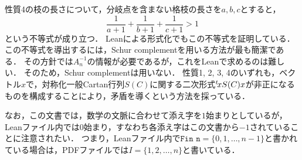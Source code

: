 性質4の枝の長さについて，分岐点を含まない格枝の長さを$a, b, c$とすると，
\begin{equation}
  \frac{1}{a + 1} + \frac{1}{b + 1} + \frac{1}{c + 1} > 1
\end{equation}
という不等式が成り立つ．
Leanによる形式化でもこの不等式を証明している．
この不等式を導出するには，Schur complementを用いる方法が最も簡潔である．
その方針では$A_n^{-1}$の情報が必要であるが，これをLeanで求めるのは難しい．
そのため，Schur complementは用いない．
性質1, 2, 3, 4のいずれも，ベクトル$x$で，対称化一般Cartan行列$S(C)$に関する二次形式${}^t\!x S(C) x$が非正になるものを構成することにより，矛盾を導くという方法を採っている．


なお，この文書では，数学の文脈に合わせて添え字を$1$始まりとしているが，Leanファイル内では$0$始まり，すなわち各添え字はこの文書から$-1$されていることに注意されたい．
つまり，Leanファイル内で$\texttt{Fin n} = \{0, 1, \ldots, n-1\}$と書かれている場合は，PDFファイルでは$I = \{1, 2, \ldots, n\}$と書いている．
